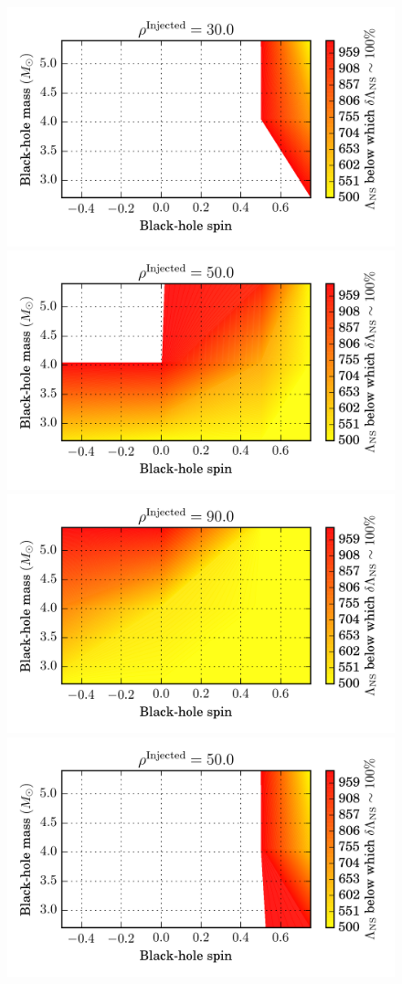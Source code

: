 \documentclass[aps,prd,amsmath,floats,floatfix, twocolumn,
superscriptaddress,nofootinbib,showpacs]{revtex4-1}
\begin{document}
\begin{figure}
\centering    
\includegraphics[width=.65\columnwidth]{plots-TT/TT_LambdaThresholdForLambdaMeasurement_BHspin_BHmass_SNR30_0_CI68_3.png}
\includegraphics[width=.65\columnwidth]{plots-TT/TT_LambdaThresholdForLambdaMeasurement_BHspin_BHmass_SNR50_0_CI68_3.png}
\includegraphics[width=.65\columnwidth]{plots-TT/TT_LambdaThresholdForLambdaMeasurement_BHspin_BHmass_SNR90_0_CI68_3.png}\\
\includegraphics[width=.65\columnwidth]{plots-TT/TT_LambdaThresholdForLambdaMeasurement_BHspin_BHmass_SNR50_0_CI90_0.png}

\end{figure}
\end{document}
